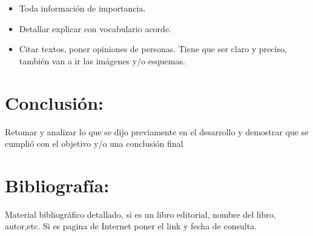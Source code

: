\documentclass[12pt]{article}
\begin{document}
{{\begin{minipage}[c][\paperheight]{\paperwidth}
\begin{itemize}
	\item Toda información de importancia.

	\item Detallar explicar con vocabulario acorde. 

	\item Citar textos, poner opiniones de personas. Tiene que ser claro y
		preciso, también van a ir las imágenes y/o esquemas.

\end{itemize}

\section*{Conclusión:}

Retomar y analizar lo que se dijo previamente en el desarrollo y demostrar que
se cumplió con el objetivo y/o una conclusión final 

\section*{Bibliografía:}

Material bibliográfico detallado, si es un libro editorial, nombre del libro,
autor,etc. Si es pagina de Internet poner el link y fecha de consulta. 

\end{minipage}
}

}

 
\end{document}
